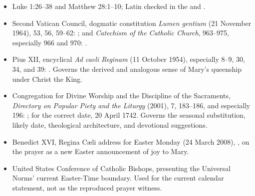 \begin{itemize}
  \item Luke 1:26--38 and Matthew 28:1--10; Latin checked in the  and .
  \item Second Vatican Council, dogmatic constitution \textit{Lumen gentium} (21 November 1964), 53, 56, 59--62: ; and \textit{Catechism of the Catholic Church}, 963--975, especially 966 and 970: .
  \item Pius XII, encyclical \textit{Ad caeli Reginam} (11 October 1954), especially 8--9, 30, 34, and 39: . Governs the derived and analogous sense of Mary's queenship under Christ the King.
  \item Congregation for Divine Worship and the Discipline of the Sacraments, \textit{Directory on Popular Piety and the Liturgy} (2001), 7, 183--186, and especially 196: ;  for the correct date, 20 April 1742. Governs the seasonal substitution, likely date, theological architecture, and devotional suggestions.
  \item Benedict XVI, Regina C{\ae}li address for Easter Monday (24 March 2008), , on the prayer as a new Easter announcement of joy to Mary.
  \item United States Conference of Catholic Bishops,  presenting the Universal Norms' current Easter-Time boundary. Used for the current calendar statement, not as the reproduced prayer witness.
\end{itemize}

